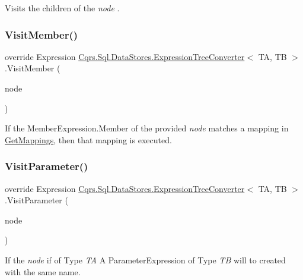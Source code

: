 Visits the children of the {\itshape node} . 

\mbox{\label{classCqrs_1_1Sql_1_1DataStores_1_1ExpressionTreeConverter_ab6eca1d967e864aee4697f64ea9b23a0_ab6eca1d967e864aee4697f64ea9b23a0}} 
\subsubsection{\texorpdfstring{Visit\+Member()}{VisitMember()}}
{\footnotesize\ttfamily override Expression \hyperlink{classCqrs_1_1Sql_1_1DataStores_1_1ExpressionTreeConverter}{Cqrs.\+Sql.\+Data\+Stores.\+Expression\+Tree\+Converter}$<$ TA, TB $>$.Visit\+Member (\begin{DoxyParamCaption}\item[{Member\+Expression}]{node }\end{DoxyParamCaption})\hspace{0.3cm}{\ttfamily [protected]}}



If the Member\+Expression.\+Member of the provided {\itshape node}  matches a mapping in \hyperlink{classCqrs_1_1Sql_1_1DataStores_1_1ExpressionTreeConverter_abd0d906a5b8abd8520874104d3bfcad0_abd0d906a5b8abd8520874104d3bfcad0}{Get\+Mappings}, then that mapping is executed. 

\mbox{\label{classCqrs_1_1Sql_1_1DataStores_1_1ExpressionTreeConverter_a88eef3bef4d4ad3caab1cd2cc033873b_a88eef3bef4d4ad3caab1cd2cc033873b}} 
\subsubsection{\texorpdfstring{Visit\+Parameter()}{VisitParameter()}}
{\footnotesize\ttfamily override Expression \hyperlink{classCqrs_1_1Sql_1_1DataStores_1_1ExpressionTreeConverter}{Cqrs.\+Sql.\+Data\+Stores.\+Expression\+Tree\+Converter}$<$ TA, TB $>$.Visit\+Parameter (\begin{DoxyParamCaption}\item[{Parameter\+Expression}]{node }\end{DoxyParamCaption})\hspace{0.3cm}{\ttfamily [protected]}}



If the {\itshape node}  if of Type {\itshape TA}  A Parameter\+Expression of Type {\itshape TB}  will to created with the same name. 

